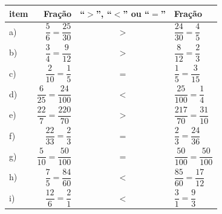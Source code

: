 \documentclass[10 pt,usenames,dvipsnames, oneside]{article}
\begin{document}
\ifdefined\prof
\begin{solucao}

\renewcommand\arraystretch{2}
\noindent
    \begin{tabular}{lrcl}

       item &  Fração &  ``$>$'', ``$<$'' ou ``$=$'' &  Fração \\
      \hline
       a) &  $\dfrac{5}{6} = \dfrac{25}{30}$ &   $>$  &  $\dfrac{24}{30} =
\dfrac{4}{5}$ \\

       b) &  $\dfrac{3}{4} = \dfrac{9}{12}$ &   $>$  &  $\dfrac{8}{12} =
\dfrac{2}{3}$ \\

       c) &  $\dfrac{2}{10} = \dfrac{1}{5}$ &   $=$  &  $\dfrac{1}{5} =
\dfrac{3}{15}$ \\

       d) &  $\dfrac{6}{25} = \dfrac{24}{100}$ &   $<$  &  $\dfrac{25}{100} =
\dfrac{1}{4}$ \\

       e) &  $\dfrac{22}{7} = \dfrac{220}{70}$ &   $>$  &  $\dfrac{217}{70} =
\dfrac{31}{10}$ \\

       f) &  $\dfrac{22}{33} = \dfrac{2}{3}$ &   $=$  &  $\dfrac{2}{3} =
\dfrac{24}{36}$ \\

       g) &  $\dfrac{5}{10} = \dfrac{50}{100}$ &   $=$  &  $\dfrac{50}{100} =
\dfrac{50}{100}$ \\

       h) &  $\dfrac{7}{5} = \dfrac{84}{60}$ &   $<$  &  $\dfrac{85}{60} =
\dfrac{17}{12}$ \\

       i) &  $\dfrac{12}{6} = \dfrac{2}{1}$ &   $<$  &  $\dfrac{3}{1} =
\dfrac{9}{3}$ \\

    \end{tabular}

\end{solucao}
\fi
\end{document}
